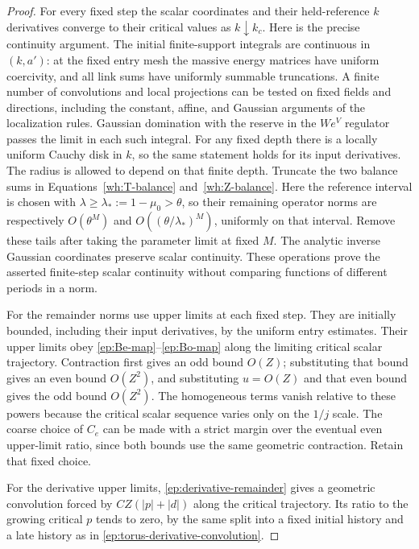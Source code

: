 \begin{proof}
For every fixed step the scalar coordinates and their
held-reference $k$ derivatives converge to their critical
values as $k\downarrow k_c$.  Here is the precise
continuity argument.  The initial finite-support integrals
are continuous in $(k,a')$: at the fixed entry mesh the
massive energy matrices have uniform coercivity, and all
link sums have uniformly summable truncations.  A finite
number of convolutions and local projections can be tested
on fixed fields and directions, including the constant,
affine, and Gaussian arguments of the localization rules.
Gaussian domination with the reserve in the $W e^V$
regulator passes the limit in each such integral.
For any fixed depth there is a locally uniform Cauchy disk
in $k$, so the same statement holds for its input
derivatives.  The radius is allowed to depend on that
finite depth.  Truncate the two balance sums in
Equations~\eqref{wh:T-balance} and~\eqref{wh:Z-balance}.
Here the reference interval is chosen with
$\lambda\ge\lambda_*:=1-\mu_0>\theta$, so their remaining
operator norms are respectively $O(\theta^M)$ and
$O((\theta/\lambda_*)^M)$, uniformly on that interval.
Remove these tails after taking the parameter limit at
fixed $M$.
The analytic inverse
Gaussian coordinates preserve scalar continuity.
These operations prove the asserted finite-step scalar
continuity without comparing functions of different
periods in a norm.

For the remainder norms use upper limits at each fixed
step.  They are initially bounded, including their input
derivatives, by the uniform entry estimates.  Their upper
limits obey \eqref{ep:Be-map}--\eqref{ep:Bo-map} along
the limiting critical scalar trajectory.
Contraction first gives an odd bound $O(Z)$; substituting
that bound gives an even bound $O(Z^2)$, and substituting
$u=O(Z)$ and that even bound gives the odd bound $O(Z^2)$.
The homogeneous terms vanish relative to these powers
because the critical scalar sequence varies only on the
$1/j$ scale.  The coarse choice of $C_e$ can be made with a strict
margin over the eventual even upper-limit ratio, since both bounds
use the same geometric contraction.  Retain that fixed choice.

For the derivative upper limits,
\eqref{ep:derivative-remainder} gives a geometric
convolution forced by $CZ(|p|+|d|)$ along the critical
trajectory.  Its ratio to the growing critical $p$ tends
to zero, by the same split into a fixed initial history and
a late history as in
\eqref{ep:torus-derivative-convolution}.


\end{proof}
